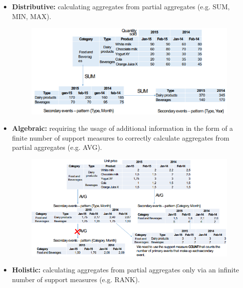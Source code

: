 \begin{itemize}
    \item \textbf{Distributive:} calculating aggregates from partial aggregates (e.g. SUM, MIN, MAX).
    \begin{figure}[ht!]
        \centering
        \includegraphics[scale=0.8]{images/DFM_distributive_operator.png}
    \end{figure}
    \item \textbf{Algebraic:} requiring the usage of additional information in the form of a finite number of support measures to correctly calculate aggregates from partial aggregates (e.g. AVG).
    \begin{figure}[ht!]
        \centering
        \includegraphics[scale=0.8]{images/DFM_algebraic_operator.png}
    \end{figure}
    \item \textbf{Holistic:} calculating aggregates from partial aggregates only via an infinite number of support measures (e.g. RANK).
\end{itemize}

